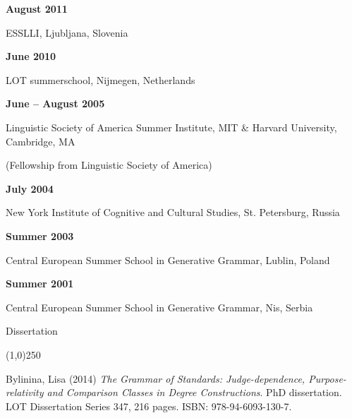 \documentclass[12pt,letterpaper]{article}
\begin{document}
\vspace{2mm}

\small{
\noindent\textbf{August 2011}

ESSLLI, Ljubljana, Slovenia
}

\vspace{2mm}

\small{
\noindent\textbf{June 2010}

LOT summerschool, Nijmegen, Netherlands
}

\vspace{2mm}

\small{
\noindent\textbf{June -- August 2005}

Linguistic Society of America Summer Institute, MIT \& Harvard University, Cambridge, MA

(Fellowship from Linguistic Society of America) 
}

\vspace{2mm}

\small{
\noindent\textbf{July 2004}

New York Institute of Cognitive and Cultural Studies, St. Petersburg, Russia
}

\vspace{2mm}

\small{
\noindent\textbf{Summer 2003}

Central European Summer School in Generative Grammar, Lublin, Poland
}

\vspace{2mm}

\small{
\noindent\textbf{Summer 2001}

Central European Summer School in Generative Grammar, Nis, Serbia
}

\vspace{5mm}

\noindent \Large{Dissertation}

\vspace{-4mm}
\noindent\line(1,0){250}


\small{
\begin{hangparas}{.25in}{1} 

Bylinina, Lisa (2014) {\it The Grammar of Standards: Judge-dependence, Purpose-relativity and Comparison Classes in Degree Constructions}. PhD dissertation. LOT Dissertation Series 347, 216 pages. ISBN: 978-94-6093-130-7.

\vspace{1mm}

\end{hangparas}
}
\end{document}

